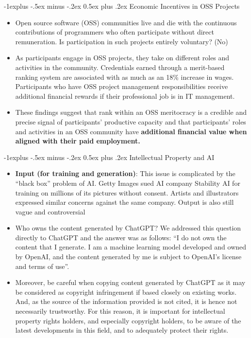 \documentclass[12pt, landscape]{article}
\makeatletter
\renewcommand{\subsection}{\@startsection{subsection}{2}{0mm}%
                                {-1explus -.5ex minus -.2ex}%
                                {0.5ex plus .2ex}%
                                {\normalfont\normalsize\bfseries}}
\makeatother
\begin{document}
\begin{multicols*}{3}
\subsection{Economic Incentives in OSS Projects}
\begin{itemize}
\item Open source software (OSS) communities live and die with the continuous contributions of programmers who often participate without direct remuneration. Is participation in such projects entirely voluntary? (No)
\item As participants engage in OSS projects, they take on different roles and activities in the community. Credentials earned through a merit-based ranking system are associated with as much as an 18\% increase in wages. Participants who have OSS project management responsibilities receive additional financial rewards if their professional job is in IT management. 
\item These findings suggest that rank within an OSS meritocracy is a credible and precise signal of participants’ productive capacity and that participants’ roles and activities in an OSS community have \textbf{additional financial value when aligned with their paid employment.}
\end{itemize}

\subsection{Intellectual Property and AI}
\begin{itemize}
\item \textbf{Input (for training and generation)}: This issue is complicated by the “black box” problem of AI. Getty Images sued AI company Stability AI for training on millions of its pictures without consent. Artists and illustrators expressed similar concerns against the same company. Output is also still vague and controversial
\item Who owns the content generated by ChatGPT? We addressed this question directly to ChatGPT and the answer was as follows: “I do not own the content that I generate. I am a machine learning model developed and owned by OpenAI, and the content generated by me is subject to OpenAI's license and terms of use”.
\item Moreover, be careful when copying content generated by ChatGPT as it may be considered as copyright infringement if based closely on existing works. And, as the source of the information provided is not cited, it is hence not necessarily trustworthy. For this reason, it is important for intellectual property rights holders, and especially copyright holders, to be aware of the latest developments in this field, and to adequately protect their rights.
\end{itemize}


\end{multicols*}
\end{document}
